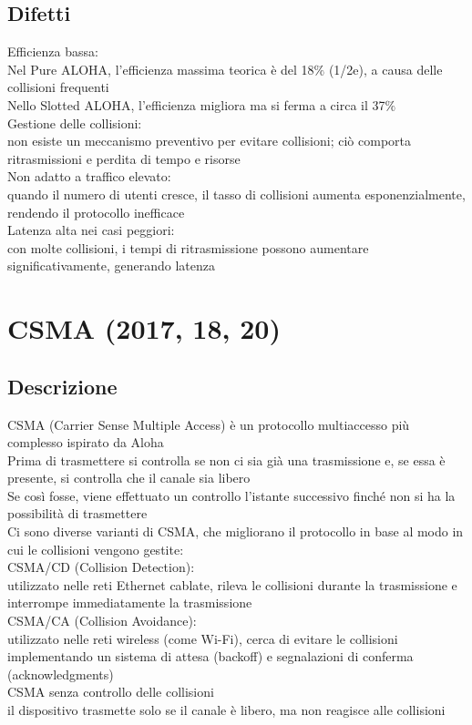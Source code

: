 \documentclass[10pt,oneside,a4paper]{article}
\begin{document}
\subsection{Difetti}
Efficienza bassa:\\
Nel Pure ALOHA, l'efficienza massima teorica è del 18$\%$ (1/2e), a causa delle collisioni frequenti\\
Nello Slotted ALOHA, l'efficienza migliora ma si ferma a circa il 37$\%$\\
Gestione delle collisioni:\\
non esiste un meccanismo preventivo per evitare collisioni; ciò comporta ritrasmissioni e perdita di tempo e risorse\\
Non adatto a traffico elevato:\\
quando il numero di utenti cresce, il tasso di collisioni aumenta esponenzialmente, rendendo il protocollo inefficace\\
Latenza alta nei casi peggiori:\\
con molte collisioni, i tempi di ritrasmissione possono aumentare significativamente, generando latenza
\section{CSMA (2017, 18, 20)}
\subsection{Descrizione}
CSMA (Carrier Sense Multiple Access) è un protocollo multiaccesso più complesso ispirato da Aloha\\
Prima di trasmettere si controlla se non ci sia già una trasmissione e, se essa è presente, si controlla che il canale sia libero\\
Se così fosse, viene effettuato un controllo l'istante successivo finché non si ha la possibilità di trasmettere\\
Ci sono diverse varianti di CSMA, che migliorano il protocollo in base al modo in cui le collisioni vengono gestite:\\
CSMA/CD (Collision Detection):\\
utilizzato nelle reti Ethernet cablate, rileva le collisioni durante la trasmissione e interrompe immediatamente la trasmissione\\
CSMA/CA (Collision Avoidance):\\
utilizzato nelle reti wireless (come Wi-Fi), cerca di evitare le collisioni implementando un sistema di attesa (backoff) e segnalazioni di conferma (acknowledgments)\\
CSMA senza controllo delle collisioni\\
il dispositivo trasmette solo se il canale è libero, ma non reagisce alle collisioni
\end{document}
